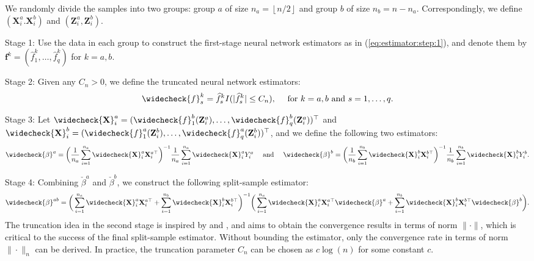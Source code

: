 \documentclass[11pt, preprint]{imsart}
\numberwithin{equation}{section}
\def \bfX{\mathbf{X}}
\def \bfZ{\mathbf{Z}}
\def \bff{\mathbf{f}}
\def \bff{\mathbf{f}}
\newcommand{\floor}[1]{\left\lfloor #1 \right\rfloor}
\theoremstyle{plain}
\theoremstyle{definition}
\begin{document}
We randomly divide the samples into two groups: group $a$ of size $n_a=\floor{n/2}$ and group $b$ of size $n_b=n-n_a$. Correspondingly, we define $(\bfX_i^a. \bfX_i^b)$ and $(\bfZ_i^a,\bfZ_i^b)$. 

Stage 1: Use the data in each group to construct the first-stage neural network estimators as in (\ref{eq:estimator:step:1}), and denote them by $\bff^k=(\widehat{f}_1^k,\ldots, \widehat{f}_q^k)$ for $k=a,b$.  

Stage 2: Given any $C_n>0$, we define the truncated neural network estimators:  
\begin{eqnarray}
	\widecheck{f}_s^k=\widehat{f}_s^kI(|\widehat{f}_s^k|\leq C_n),\quad \textrm{ for } k=a,b \textrm{ and } s=1,\ldots, q. \nonumber
\end{eqnarray}

Stage 3: Let $\widecheck{\bfX}_i^a=(\widecheck{f}_1^b(\bfZ_i^a),\ldots, \widecheck{f}_q^b(\bfZ_i^a))^\top$ and $\widecheck{\bfX}_i^b=(\widecheck{f}_1^a(\bfZ_i^b),\ldots, \widecheck{f}_q^a(\bfZ_i^b))^\top$, and we define the following two estimators:
\begin{equation*}
	\widecheck{\beta}^a=\bigg(\frac{1}{n_a}\sum_{i=1}^{n_a}\widecheck{\bfX}_i^a\bfX_i^{a\top}\bigg)^{-1}\frac{1}{n_a}\sum_{i=1}^{n_a}\widecheck{\bfX}_i^a Y_i^a \quad \textrm{ and } \quad \widecheck{\beta}^b=\bigg(\frac{1}{n_b}\sum_{i=1}^{n_b}\widecheck{\bfX}_i^b\bfX_i^{b\top}\bigg)^{-1}\frac{1}{n_b}\sum_{i=1}^{n_b}\widecheck{\bfX}_i^b Y_i^b.
\end{equation*}

Stage 4: Combining $\check{\beta}^a$ and $\check{\beta}^b$, we construct the following split-sample estimator:
\begin{equation*}
	\widecheck{\beta}^{ab}=\bigg(\sum_{i=1}^{n_a}\widecheck{\bfX}_i^a\bfX_i^{a\top}+\sum_{i=1}^{n_b}\widecheck{\bfX}_i^b\bfX_i^{b\top}\bigg)^{-1}\bigg(\sum_{i=1}^{n_a}\widecheck{\bfX}_i^a\bfX_i^{a\top}\widecheck{\beta}^a+\sum_{i=1}^{n_b}\widecheck{\bfX}_i^b\bfX_i^{b\top}\widecheck{\beta}^b\bigg).
\end{equation*}
The truncation idea in the second stage is inspired by \cite{gkkw06} and \cite{bk19}, and aims to obtain the convergence results in terms of norm $\|\cdot\|$, which is critical to the success of the final split-sample estimator. Without bounding the estimator, only the convergence rate in terms of  norm $\|\cdot\|_n$ can be derived. {In practice, the truncation parameter $C_n$ can be chosen as $c\log(n)$ for some constant $c$.}
\end{document}
